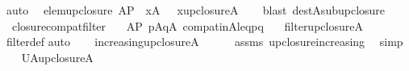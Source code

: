 \begin{isabellebody}
\ auto%
\endisatagproof
{\isafoldproof}%
%
\isadelimproof
\isanewline
%
\endisadelimproof
\isanewline
{}\isamarkupfalse%
\ \ elem{\isacharunderscore}{\kern0pt}upclosure{\isacharcolon}{\kern0pt}\ {\isachardoublequoteopen}A{\isasymsubseteq}P\ {\isasymLongrightarrow}\ x{\isasymin}A\ \ {\isasymLongrightarrow}\ x{\isasymin}upclosure{\isacharparenleft}{\kern0pt}A{\isacharparenright}{\kern0pt}{\isachardoublequoteclose}\isanewline
%
\isadelimproof
\ \ %
\endisadelimproof
%
\isatagproof
{}\isamarkupfalse%
\ {\isacharparenleft}{\kern0pt}blast\ dest{\isacharcolon}{\kern0pt}A{\isacharunderscore}{\kern0pt}sub{\isacharunderscore}{\kern0pt}upclosure{\isacharparenright}{\kern0pt}%
\endisatagproof
{\isafoldproof}%
%
\isadelimproof
\isanewline
%
\endisadelimproof
\isanewline
{}\isamarkupfalse%
\ \ closure{\isacharunderscore}{\kern0pt}compat{\isacharunderscore}{\kern0pt}filter{\isacharcolon}{\kern0pt}\isanewline
\ \ \ {\isachardoublequoteopen}A{\isasymsubseteq}P{\isachardoublequoteclose}\ {\isachardoublequoteopen}{\isacharparenleft}{\kern0pt}{\isasymforall}p{\isasymin}A{\isachardot}{\kern0pt}{\isasymforall}q{\isasymin}A{\isachardot}{\kern0pt}\ compat{\isacharunderscore}{\kern0pt}in{\isacharparenleft}{\kern0pt}A{\isacharcomma}{\kern0pt}leq{\isacharcomma}{\kern0pt}p{\isacharcomma}{\kern0pt}q{\isacharparenright}{\kern0pt}{\isacharparenright}{\kern0pt}{\isachardoublequoteclose}\isanewline
\ \ \ {\isachardoublequoteopen}filter{\isacharparenleft}{\kern0pt}upclosure{\isacharparenleft}{\kern0pt}A{\isacharparenright}{\kern0pt}{\isacharparenright}{\kern0pt}{\isachardoublequoteclose}\isanewline
%
\isadelimproof
\ \ %
\endisadelimproof
%
\isatagproof
{}\isamarkupfalse%
\ filter{\isacharunderscore}{\kern0pt}def\isanewline
{}\isamarkupfalse%
{\isacharparenleft}{\kern0pt}auto{\isacharparenright}{\kern0pt}\isanewline
\ \ \isamarkupfalse%
\ {\isachardoublequoteopen}increasing{\isacharparenleft}{\kern0pt}upclosure{\isacharparenleft}{\kern0pt}A{\isacharparenright}{\kern0pt}{\isacharparenright}{\kern0pt}{\isachardoublequoteclose}\isanewline
\ \ \ \ \isamarkupfalse%
\ assms\ upclosure{\isacharunderscore}{\kern0pt}increasing\ \isamarkupfalse%
\ simp\isanewline
{}\isamarkupfalse%
\isanewline
\ \ \isamarkupfalse%
\ {\isacharquery}{\kern0pt}UA{\isacharequal}{\kern0pt}{\isachardoublequoteopen}upclosure{\isacharparenleft}{\kern0pt}A{\isacharparenright}{\kern0pt}{\isachardoublequoteclose}\isanewline
\ \ \isamarkupfalse%

\end{isabellebody}
